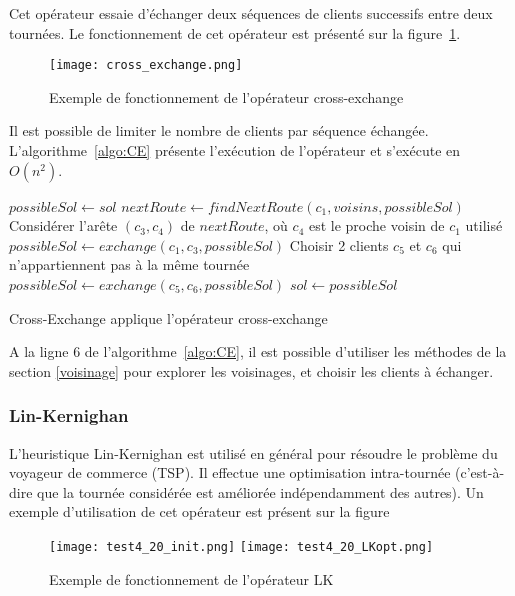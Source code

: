 \documentclass[a4paper,11pt]{article}%
\begin{document}
Cet opérateur essaie d'échanger deux séquences de clients successifs entre deux tournées. Le fonctionnement de cet opérateur est présenté sur la figure~\ref{CE}.

\begin{figure}
\centering
\texttt{[image: cross\_exchange.png]}
\caption{Exemple de fonctionnement de l'opérateur cross-exchange}
\label{CE}
\end{figure}

Il est possible de limiter le nombre de clients par séquence échangée.
L'algorithme~\ref{algo:CE} présente l'exécution de l'opérateur et s'exécute en $O(n^2)$.

\begin{algorithm}
\DontPrintSemicolon %
$possibleSol \gets sol$\;
$nextRoute \gets findNextRoute(c_1,voisins,possibleSol)$\;
Considérer l'arête $(c_3,c_4)$ de $nextRoute$, où $c_4$ est le proche voisin de $c_1$ utilisé\;
$possibleSol \gets exchange(c_1,c_3,possibleSol)$\;
Choisir 2 clients $c_5$ et $c_6$ qui n'appartiennent pas à la même tournée\;
$possibleSol \gets exchange(c_5,c_6,possibleSol)$\;
 {
	$sol \gets possibleSol$\;
}
\;
\caption{{\sc Cross-Exchange} applique l'opérateur cross-exchange}
\label{algo:CE}
\end{algorithm}

A la ligne $6$ de l'algorithme~\ref{algo:CE}, il est possible d'utiliser les méthodes de la section \ref{voisinage} pour explorer les voisinages, et choisir les clients à échanger.

\subsubsection{Lin-Kernighan}

L'heuristique Lin-Kernighan est utilisé en général pour résoudre le problème du voyageur de commerce (TSP). Il effectue une optimisation intra-tournée (c'est-à-dire que la tournée considérée est améliorée indépendamment des autres). 
Un exemple d'utilisation de cet opérateur est présent sur la figure~

\begin{figure}
\centering
\texttt{[image: test4\_20\_init.png]}
\texttt{[image: test4\_20\_LKopt.png]}

\caption{Exemple de fonctionnement de l'opérateur LK}
\label{LK}
\end{figure}
\end{document}
